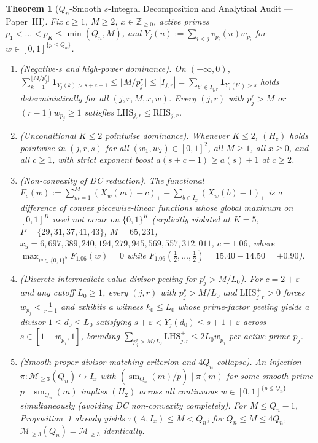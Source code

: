 \documentclass[11pt]{article}
\newtheorem{theorem}{Theorem}
\theoremstyle{remark}
\DeclareMathOperator{\sm}{sm}
\begin{document}
\begin{theorem}[$Q_n$-Smooth $s$-Integral Decomposition and Analytical Audit --- Paper~III]
Fix $c \ge 1$, $M \ge 2$, $x \in \mathbb{Z}_{\ge 0}$, active primes $p_1 < \dots < p_K \le \min(Q_n, M)$, and $Y_j(u) := \sum_{i < j} v_{p_i}(u) w_{p_i}$ for $w \in [0, 1]^{\{p \le Q_n\}}$.
\begin{enumerate}
\item \emph{(Negative-$s$ and high-power dominance).} On $(-\infty, 0)$, $\sum_{k=1}^{\lfloor M/p_j^r \rfloor} \mathbf{1}_{Y_j(k) > s + c - 1} \le \lfloor M / p_j^r \rfloor \le |I_{j,r}| = \sum_{b' \in I_{j,r}} \mathbf{1}_{Y_j(b') > s}$ holds deterministically for all $(j, r, M, x, w)$. Every $(j, r)$ with $p_j^r > M$ or $(r - 1) w_{p_j} \ge 1$ satisfies $\mathrm{LHS}_{j,r} \le \mathrm{RHS}_{j,r}$.
\item \emph{(Unconditional $K \le 2$ pointwise dominance).} Whenever $K \le 2$, $(H_c)$ holds pointwise in $(j, r, s)$ for all $(w_1, w_2) \in [0, 1]^2$, all $M \ge 1$, all $x \ge 0$, and all $c \ge 1$, with strict exponent boost $a(s + c - 1) \ge a(s) + 1$ at $c \ge 2$.
\item \emph{(Non-convexity of DC reduction).} The functional $F_c(w) := \sum_{m=1}^M (X_w(m) - c)_+ - \sum_{b \in I_x} (X_w(b) - 1)_+$ is a difference of convex piecewise-linear functions whose global maximum on $[0, 1]^K$ need not occur on $\{0, 1\}^K$ (explicitly violated at $K = 5$, $P = \{29, 31, 37, 41, 43\}$, $M = 65{,}231$, $x_5 = 6{,}697{,}389{,}240{,}194{,}279{,}945{,}569{,}557{,}312{,}011$, $c = 1.06$, where $\max_{w \in \{0, 1\}^5} F_{1.06}(w) = 0$ while $F_{1.06}(\tfrac{1}{2}, \dots, \tfrac{1}{2}) = 15.40 - 14.50 = +0.90$).
\item \emph{(Discrete intermediate-value divisor peeling for $p_j^r > M / L_0$).} For $c = 2 + \varepsilon$ and any cutoff $L_0 \ge 1$, every $(j, r)$ with $p_j^r > M / L_0$ and $\mathrm{LHS}_{j,r}^+ > 0$ forces $w_{p_j} < \frac{1}{r - 1}$ and exhibits a witness $k_0 \le L_0$ whose prime-factor peeling yields a divisor $1 \le d_0 \le L_0$ satisfying $s + \varepsilon < Y_j(d_0) \le s + 1 + \varepsilon$ across $s \in [1 - w_{p_j}, 1]$, bounding $\sum_{p_j^r > M / L_0} \mathrm{LHS}_{j,r}^+ \le 2 L_0 w_{p_j}$ per active prime $p_j$.
\item \emph{(Smooth proper-divisor matching criterion and $4 Q_n$ collapse).} An injection $\pi : \mathcal{M}_{\ge 3}(Q_n) \hookrightarrow I_x$ with $(\sm_{Q_n}(m) / p) \mid \pi(m)$ for some smooth prime $p \mid \sm_{Q_n}(m)$ implies $(H_2)$ across all continuous $w \in [0, 1]^{\{p \le Q_n\}}$ simultaneously (avoiding DC non-convexity completely). For $M \le Q_n - 1$, Proposition~1 already yields $\tau(A, I_x) \le M < Q_n$; for $Q_n \le M \le 4 Q_n$, $\mathcal{M}_{\ge 3}(Q_n) = \mathcal{M}_{\ge 3}$ identically.
\end{enumerate}
\end{theorem}
\end{document}
